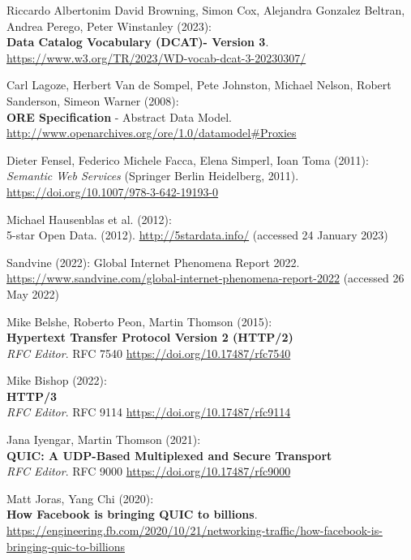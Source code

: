 \begin{thebibliography}{9}
Riccardo Albertonim David Browning, Simon Cox, Alejandra Gonzalez Beltran, Andrea Perego, Peter Winstanley (2023): \\
\textbf{Data Catalog Vocabulary (DCAT)- Version 3}.\\
\url{https://www.w3.org/TR/2023/WD-vocab-dcat-3-20230307/}


Carl Lagoze, 
Herbert Van de Sompel, 
Pete Johnston, 
Michael Nelson, 
Robert Sanderson, 
Simeon Warner (2008):\\
\textbf{ORE Specification} - {Abstract Data Model}. \\
\url{http://www.openarchives.org/ore/1.0/datamodel#Proxies} 

Dieter Fensel, Federico Michele Facca, Elena Simperl, Ioan Toma
(2011): \\
\emph{Semantic {Web Services}} ({Springer Berlin Heidelberg},
2011).
\url{https://doi.org/10.1007/978-3-642-19193-0}

Michael Hausenblas et al. (2012): \\
5-star {Open Data}. (2012).
\url{http://5stardata.info/} (accessed 24 January 2023)

Sandvine (2022): Global {Internet Phenomena Report} 2022.
\url{https://www.sandvine.com/global-internet-phenomena-report-2022}
(accessed 26 May 2022)

Mike Belshe, Roberto Peon, Martin Thomson (2015): \\
\textbf{Hypertext Transfer Protocol Version 2 (HTTP/2)} \\
\emph{RFC Editor}. RFC 7540
\url{https://doi.org/10.17487/rfc7540}

Mike Bishop (2022): \\
\textbf{{HTTP}/3}\\
\emph{RFC Editor}. RFC 9114
\url{https://doi.org/10.17487/rfc9114}

Jana Iyengar, Martin Thomson (2021): \\
\textbf{{QUIC}: {A UDP-Based Multiplexed} and {Secure Transport}}\\
\emph{RFC Editor}. RFC 9000
\url{https://doi.org/10.17487/rfc9000}

Matt Joras, Yang Chi (2020): \\
\textbf{How Facebook is bringing QUIC to billions}.
\url{https://engineering.fb.com/2020/10/21/networking-traffic/how-facebook-is-bringing-quic-to-billions}


\end{thebibliography}
